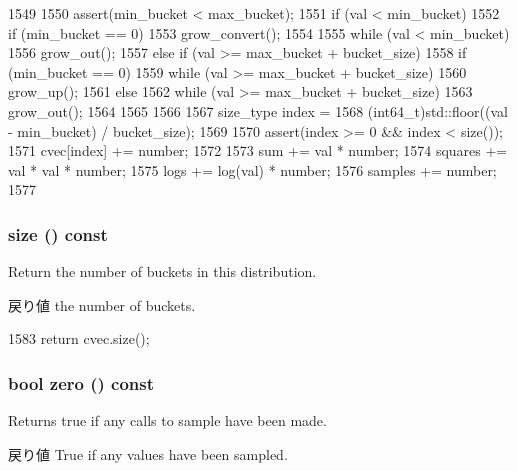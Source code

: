 \begin{DoxyCode}
1549     {
1550         assert(min_bucket < max_bucket);
1551         if (val < min_bucket) {
1552             if (min_bucket == 0)
1553                 grow_convert();
1554 
1555             while (val < min_bucket)
1556                 grow_out();
1557         } else if (val >= max_bucket + bucket_size) {
1558             if (min_bucket == 0) {
1559                 while (val >= max_bucket + bucket_size)
1560                     grow_up();
1561             } else {
1562                 while (val >= max_bucket + bucket_size)
1563                     grow_out();
1564             }
1565         }
1566 
1567         size_type index =
1568             (int64_t)std::floor((val - min_bucket) / bucket_size);
1569 
1570         assert(index >= 0 && index < size());
1571         cvec[index] += number;
1572 
1573         sum += val * number;
1574         squares += val * val * number;
1575         logs += log(val) * number;
1576         samples += number;
1577     }
\end{DoxyCode}
\hypertarget{classStats_1_1HistStor_a503ab01f6c0142145d3434f6924714e7}{
\subsubsection[{size}]{ size () const}}
\label{classStats_1_1HistStor_a503ab01f6c0142145d3434f6924714e7}
Return the number of buckets in this distribution. \begin{DoxyReturn}{戻り値}
the number of buckets. 
\end{DoxyReturn}



\begin{DoxyCode}
1583 { return cvec.size(); }
\end{DoxyCode}
\hypertarget{classStats_1_1HistStor_a4e72b01b727d3165e75cba84eb507491}{
\subsubsection[{zero}]{\setlength{\rightskip}{0pt plus 5cm}bool zero () const}}
\label{classStats_1_1HistStor_a4e72b01b727d3165e75cba84eb507491}
Returns true if any calls to sample have been made. \begin{DoxyReturn}{戻り値}
True if any values have been sampled. 
\end{DoxyReturn}



